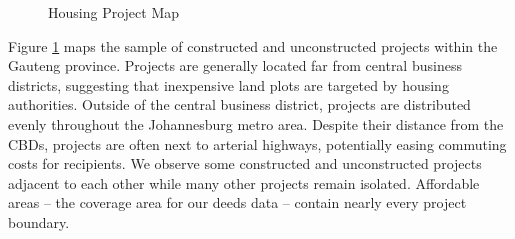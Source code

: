 \documentclass[12pt]{article}
\begin{document}

\begin{figure}[t!]
\centering
\caption{Housing Project Map}\label{figure:map}
\end{figure}

Figure \ref{figure:map} maps the sample of constructed and unconstructed projects within the Gauteng province.  Projects are generally located far from central business districts, suggesting that inexpensive land plots are targeted by housing authorities.  Outside of the central business district, projects are distributed evenly throughout the Johannesburg metro area.  Despite their distance from the CBDs, projects are often next to arterial highways, potentially easing commuting costs for recipients.  We observe some constructed and unconstructed projects adjacent to each other while many other projects remain isolated.  Affordable areas -- the coverage area for our deeds data -- contain nearly every project boundary.  




\end{document}
